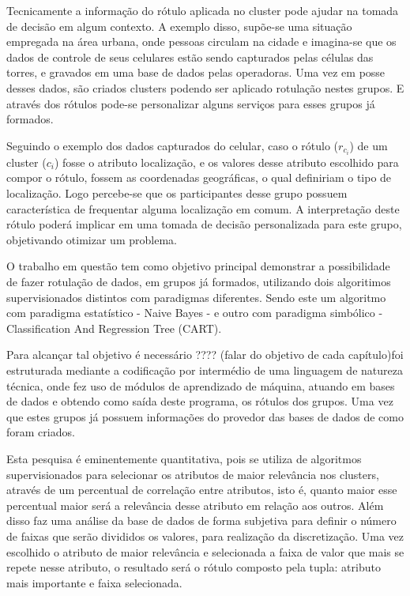 Tecnicamente a informação do rótulo aplicada no cluster pode ajudar na tomada de decisão em algum contexto. A exemplo disso, supõe-se uma situação empregada na área urbana, onde pessoas circulam na cidade e imagina-se que os dados de controle de seus celulares estão sendo capturados pelas células das torres, e gravados em uma base de dados pelas operadoras. Uma vez em posse desses dados, são criados clusters podendo ser aplicado rotulação nestes grupos. E através dos rótulos pode-se personalizar alguns serviços para esses grupos já formados. 

Seguindo o exemplo dos dados capturados do celular, caso o rótulo (${r_{c_i}}$) de um cluster (${c_i}$) fosse o  atributo localização, e os valores  desse atributo escolhido para compor o rótulo, fossem as coordenadas geográficas, o qual definiriam o tipo de localização. Logo percebe-se que os participantes desse grupo possuem característica de frequentar alguma localização em comum. A interpretação deste rótulo poderá implicar em uma tomada de decisão personalizada para este grupo, objetivando otimizar um problema.

O trabalho em questão tem como objetivo principal demonstrar a  possibilidade de fazer rotulação de dados, em grupos já formados, utilizando dois algoritimos supervisionados distintos com paradigmas diferentes. Sendo este um algoritmo com paradigma estatístico - Naive Bayes -  e outro com paradigma simbólico - Classification And Regression Tree (CART).
 
Para alcançar tal objetivo é necessário ???? (falar do objetivo de cada capítulo)foi estruturada mediante a codificação por intermédio de uma linguagem de natureza técnica, onde fez uso de módulos de aprendizado de máquina, atuando em bases de dados e obtendo como saída deste programa, os rótulos dos grupos. Uma vez que estes grupos já possuem informações do provedor das bases de dados de como foram criados.

Esta pesquisa é eminentemente quantitativa, pois se utiliza de algoritmos supervisionados para selecionar os atributos de maior relevância nos clusters, através de um percentual de correlação entre atributos, isto é, quanto maior esse percentual maior será a relevância desse atributo em relação aos outros. Além disso faz uma análise da base de dados de forma subjetiva para definir o número de faixas que serão divididos os valores, para realização da discretização. Uma vez escolhido o atributo de maior relevância e selecionada a faixa de valor que mais se repete nesse atributo, o resultado será o rótulo composto pela tupla: atributo mais importante e faixa selecionada. 

